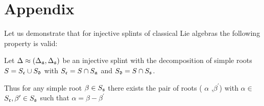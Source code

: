 

\section*{Appendix}


Let us demonstrate that for injective splints of classical Lie
algebras the following property is valid:
\begin{Prop}
Let $\Delta \approx (\Delta _{\frak{a}},\Delta _{\frak{s}})$ be an
injective
splint with the decomposition of simple roots $S=S_{\frak{c}}\cup S_{\frak{d}%
}$ with $S_{\frak{c}}=S\cap S_{\frak{a}}$ and $S_{\frak{d}}=S\cap S_{\frak{s}%
}$.
\end{Prop}
Thus for any simple root $\beta \in S_{\frak{s}}$ there exists the
pair of
roots ( $\alpha $ ,$\beta ^{\prime }$) with $\alpha \in $ $S_{\frak{c}%
},\beta ^{\prime }\in S_{\frak{s}}$ such that $\alpha =\beta
-\beta ^{\prime }$


